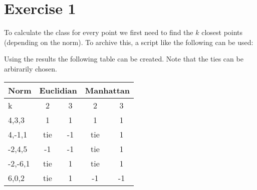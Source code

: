 \section*{Exercise 1}
To calculate the class for every point we first need to find the $k$ closest points (depending on the norm).
To archive this, a script like the following can be used:

Using the results the following table can be created. Note that the ties can be arbirarily chosen.


  \centering \begin{tabular}{l|c|c|c|c}
    Norm&\multicolumn{2}{c}{Euclidian}&\multicolumn{2}{c}{Manhattan}\\\hline
    k&2&3&2&3\\\hline
    4,3,3&1&1&1&1\\
    4,-1,1&tie&-1&tie&1\\
    -2,4,5&-1&-1&tie&1\\
    -2,-6,1&tie&1&tie&1\\
    6,0,2&tie&1&-1&-1
  \end{tabular}
